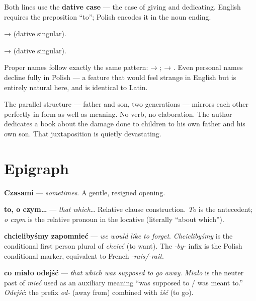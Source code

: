 
Both lines use the \textbf{dative case} — the case of giving and dedicating. 
English requires the preposition ``to''; Polish encodes it in the noun ending.

 →  (dative singular).

 →  (dative singular).

Proper names follow exactly the same pattern: 
 → ; 
 → . 
Even personal names decline fully in Polish — a feature that would feel 
strange in English but is entirely natural here, and is identical to Latin.

The parallel structure — father and son, two generations — mirrors each 
other perfectly in form as well as meaning. No verb, no elaboration. 
The author dedicates a book about the damage done to children to his own 
father and his own son. That juxtaposition is quietly devastating.

\section{Epigraph}


\textbf{Czasami} — \textit{sometimes}. A gentle, resigned opening.

\textbf{to, o czym\ldots} — \textit{that which\ldots} Relative clause construction. 
\textit{To} is the antecedent; \textit{o czym} is the relative pronoun in the 
locative (literally ``about which'').

\textbf{chcielibyśmy zapomnieć} — \textit{we would like to forget}. 
\textit{Chcielibyśmy} is the conditional first person plural of \textit{chcieć} 
(to want). The \textit{-by-} infix is the Polish conditional marker, equivalent 
to French \textit{-rais/-rait}.

\textbf{co miało odejść} — \textit{that which was supposed to go away}. 
\textit{Miało} is the neuter past of \textit{mieć} used as an auxiliary 
meaning ``was supposed to / was meant to.'' \textit{Odejść}: the prefix 
\textit{od-} (away from) combined with \textit{iść} (to go).

